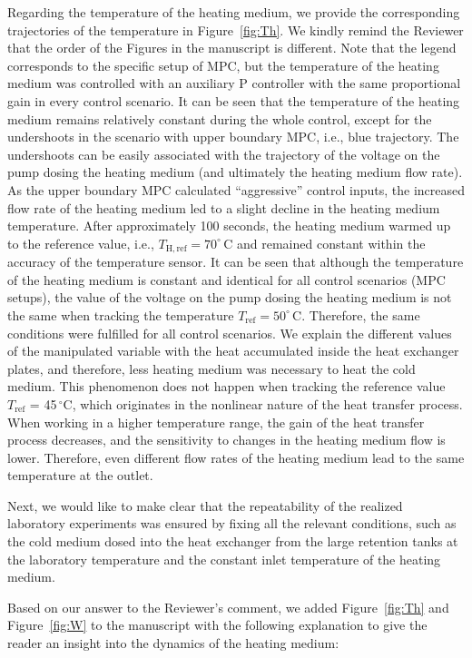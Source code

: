 \documentclass[a4paper,10pt]{article}
\begin{document}
{		
		Regarding the temperature of the heating medium, we provide the corresponding trajectories of the temperature in Figure~\ref{fig:Th}. We kindly remind the Reviewer that the order of the Figures in the manuscript is different. Note that the legend corresponds to the specific setup of MPC, but the temperature of the heating medium was controlled with an auxiliary P controller with the same proportional gain in every control scenario. It can be seen that the temperature of the heating medium remains relatively constant during the whole control, except for the undershoots in the scenario with upper boundary MPC, i.e., blue trajectory. The undershoots can be easily associated with the trajectory of the voltage on the pump dosing the heating medium (and ultimately the heating medium flow rate). As the upper boundary MPC calculated ``aggressive'' control inputs, the increased flow rate of the heating medium led to a slight decline in the heating medium temperature. After approximately 100 seconds, the heating medium warmed up to the reference value, i.e., $T_{\mathrm{H, ref}} = 70^{\circ}$\,C and remained constant within the accuracy of the temperature sensor. It can be seen that although the temperature of the heating medium is constant and identical for all control scenarios (MPC setups), the value of the voltage on the pump dosing the heating medium is not the same when tracking the temperature $T_{\mathrm{ref}} = 50^{\circ}$\,C. Therefore, the same conditions were fulfilled for all control scenarios. We explain the different values of the manipulated variable with the heat accumulated inside the heat exchanger plates, and therefore, less heating medium was necessary to heat the cold medium. This phenomenon does not happen when tracking the reference value $T_{\mathrm{ref}}$ = 45\,$^{\circ}\mathrm{C}$, which originates in the nonlinear nature of the heat transfer process. When working in a higher temperature range, the gain of the heat transfer process decreases, and the sensitivity to changes in the heating medium flow is lower. Therefore, even different flow rates of the heating medium lead to the same temperature at the outlet.
		
		Next, we would like to make clear that the repeatability of the realized laboratory experiments was ensured by fixing all the relevant conditions, such as the cold medium dosed into the heat exchanger from the large retention tanks at the laboratory temperature and the constant inlet temperature of the heating medium. 
		
		Based on our answer to the Reviewer's comment, we added Figure~\ref{fig:Th} and Figure~\ref{fig:W} to the manuscript with the following explanation to give the reader an insight into the dynamics of the heating medium:
		
}
\end{document}
